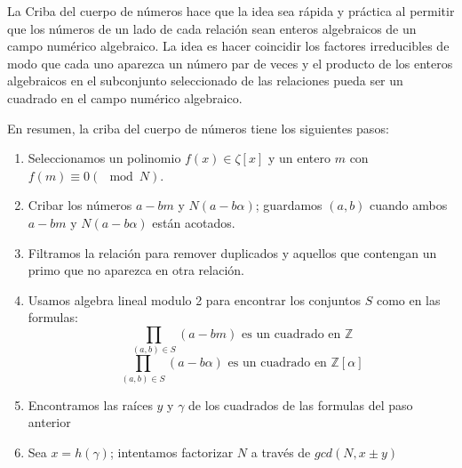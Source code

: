         La Criba del cuerpo de números hace que la idea sea rápida y práctica al permitir que los números de un lado de cada relación sean enteros algebraicos de un campo numérico algebraico. La idea es hacer coincidir los factores irreducibles de modo que cada uno aparezca un número par de veces y el producto de los enteros algebraicos en el subconjunto seleccionado de las relaciones pueda ser un cuadrado en el campo numérico algebraico.

        En resumen, la criba del cuerpo de números tiene los siguientes pasos:
        \begin{enumerate}
            \item Seleccionamos un polinomio $f(x) \in \zeta[x]$ y un entero $m$ con $f(m) \equiv 0(\mod N)$.
            \item Cribar los números $a-bm$ y $N(a-b\alpha)$; guardamos $(a,b)$ cuando ambos $a-bm$ y $N(a-b\alpha)$ están acotados.
            \item Filtramos la relación para remover duplicados y aquellos que contengan un primo que no aparezca en otra relación.
            \item Usamos algebra lineal modulo 2 para encontrar los conjuntos $S$ como en las formulas:
            \[
                \prod_{(a,b) \in S}(a - bm) \text{ es un cuadrado en } \mathbb{Z}
            \]
            \[
                \prod_{(a,b) \in S}(a - b\alpha) \text{ es un cuadrado en } \mathbb{Z}[\alpha]
            \]
            \item Encontramos las raíces $y$ y $\gamma$ de los cuadrados de las formulas del paso anterior
            \item Sea $x=h(\gamma)$; intentamos factorizar $N$ a través de $gcd(N, x\pm y)$
        \end{enumerate}